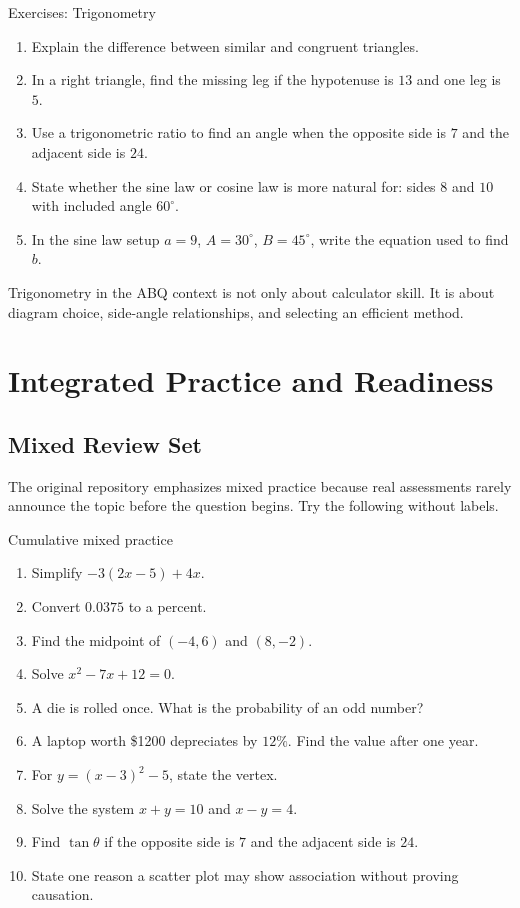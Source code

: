 \documentclass[11pt,oneside]{book}
\begin{document}
\begin{exercisebox}{Exercises: Trigonometry}
\begin{enumerate}
  \item Explain the difference between similar and congruent triangles.
  \item In a right triangle, find the missing leg if the hypotenuse is $13$ and one leg is $5$.
  \item Use a trigonometric ratio to find an angle when the opposite side is $7$ and the adjacent side is $24$.
  \item State whether the sine law or cosine law is more natural for: sides $8$ and $10$ with included angle $60^\circ$.
  \item In the sine law setup $a=9$, $A=30^\circ$, $B=45^\circ$, write the equation used to find $b$.
\end{enumerate}
\end{exercisebox}

\begin{summarybox}
Trigonometry in the ABQ context is not only about calculator skill. It is about diagram choice, side-angle relationships, and selecting an efficient method.
\end{summarybox}

\chapter{Integrated Practice and Readiness}
\section{Mixed Review Set}
The original repository emphasizes mixed practice because real assessments rarely announce the topic before the question begins. Try the following without labels.

\begin{exercisebox}{Cumulative mixed practice}
\begin{enumerate}
  \item Simplify $-3(2x-5)+4x$.
  \item Convert $0.0375$ to a percent.
  \item Find the midpoint of $(-4,6)$ and $(8,-2)$.
  \item Solve $x^2-7x+12=0$.
  \item A die is rolled once. What is the probability of an odd number?
  \item A laptop worth \$1200 depreciates by $12\%$. Find the value after one year.
  \item For $y=(x-3)^2-5$, state the vertex.
  \item Solve the system $x+y=10$ and $x-y=4$.
  \item Find $\tan\theta$ if the opposite side is $7$ and the adjacent side is $24$.
  \item State one reason a scatter plot may show association without proving causation.
\end{enumerate}
\end{exercisebox}
\end{document}
